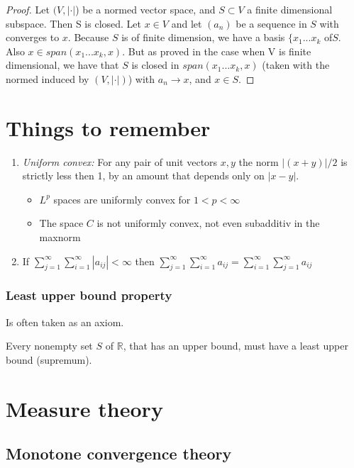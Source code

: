 \documentclass[titlepage]{article}
\begin{document}
\begin{proof}
Let $(V, |\cdot|$) be a normed vector space, and $S\subset V$ a finite dimensional subspace. Then S is closed.
Let $x\in V$ and let $(a_n)$ be a sequence in $S$ with converges to $x$. Because $S$ is of finite dimension, we have a basis $\{x_1...x_k$ of$S$. Also $x\in span(x_1...x_k,x)$. But as proved in the case when V is finite dimensional, we have that $S$ is closed in $span(x_1...x_k,x)$ (taken with the normed induced by $(V, |\cdot|)$) with $a_n \rightarrow x$, and $x\in S$.
\end{proof}
\section{Things to remember}
\begin{enumerate}
\item \textit{Uniform convex:} For any pair of unit vectors $x,y$ the norm $|(x+y)|/2$ is strictly less then 1, by an amount that depends only on $|x-y|$.
   \begin{itemize}
        \item $L^p$ spaces are uniformly convex for $1<p<\infty$
        \item The space $C$ is not uniformly convex, not even subadditiv in the maxnorm
    \end{itemize}
    \item If $\sum_{j = 1}^\infty \sum_{i = 1}^\infty |a_{ij}| < \infty $ then  $\sum_{j = 1}^\infty \sum_{i = 1}^\infty a_{ij}  = \sum_{i = 1}^\infty \sum_{j = 1}^\infty a_{ij}$ 
\end{enumerate}


\subsubsection{Least upper bound property}
Is often taken as an axiom.

Every nonempty set $S$ of $\mathbb{R}$, that has an upper bound, must have a least upper bound (supremum).
\section{Measure theory}
\subsection*{Monotone convergence theory}
\end{document}
